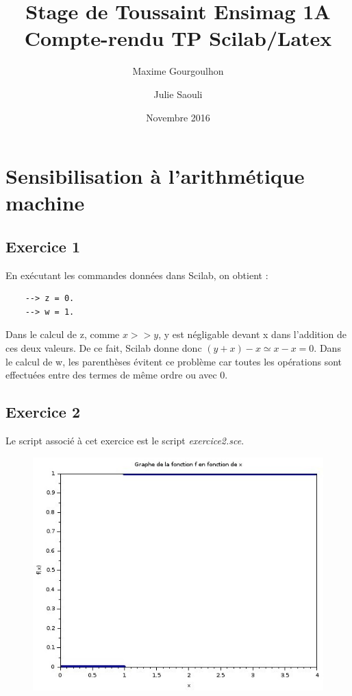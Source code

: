 \documentclass[a4paper,11pt]{article}
\title{Stage de Toussaint Ensimag 1A \\ Compte-rendu TP Scilab/Latex}
\author{Maxime Gourgoulhon \and Julie Saouli}
\date{Novembre 2016}
\begin{document}
\maketitle

\section{Sensibilisation à l'arithmétique machine}

\subsection*{Exercice 1}
	En exécutant les commandes données dans Scilab, on obtient :
	\begin{verbatim}
	--> z = 0.
	--> w = 1.
	\end{verbatim}
	
	Dans le calcul de z, comme $x >> y$, y est négligable devant x dans l'addition de ces deux valeurs. De ce fait, Scilab donne donc $(y+x)-x \simeq x - x = 0$.
	Dans le calcul de w, les parenthèses évitent ce problème car toutes les opérations sont effectuées entre des termes de même ordre ou avec 0.

	
\subsection*{Exercice 2}
	Le script associé à cet exercice est le script \textit{exercice2.sce}.
\begin{figure}[H]
	\centering
	\includegraphics[scale=0.5]{graphes/exercice2.jpg}	
\end{figure}
\end{document}

